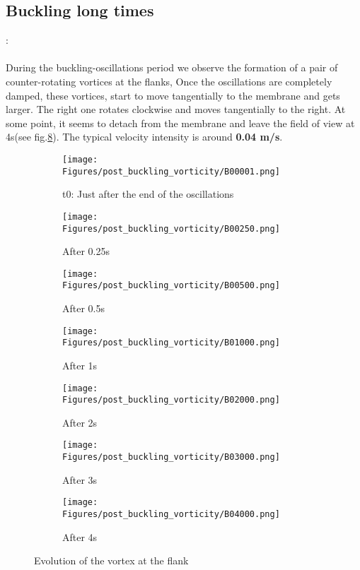 \documentclass[a4paper,10pt]{report}
\begin{document}
\subsection{Buckling long times}:
\paragraph{}
During the buckling-oscillations period we observe the formation of a pair of counter-rotating vortices at the flanks, Once the oscillations are completely damped, these vortices, start to move tangentially to the membrane and gets larger. The right one rotates clockwise and moves tangentially to the right.
At some point, it seems to detach from the membrane and leave the field of view at 4s(see fig.\ref{fig:vortexlife}).
The typical velocity intensity is around \textbf{0.04 m/s}.
 \begin{figure}[htbp]%
	\centering%
	 \begin{subfigure}[t]{0.25\textwidth}%
        \texttt{[image: Figures/post\_buckling\_vorticity/B00001.png]}%
        \caption{t0: Just after the end of the oscillations}%
				\label{fig:t0}%
    \end{subfigure}%
		\begin{subfigure}[t]{0.25\textwidth}%
        \texttt{[image: Figures/post\_buckling\_vorticity/B00250.png]}%
        \caption{After 0.25s}%
				\label{fig:25ms}%
    \end{subfigure}%
    \begin{subfigure}[t]{0.25\textwidth}%
        \texttt{[image: Figures/post\_buckling\_vorticity/B00500.png]}%
        \caption{After 0.5s}%
				\label{fig:500ms}%
    \end{subfigure}%
		\begin{subfigure}[t]{0.25\textwidth}%
        \texttt{[image: Figures/post\_buckling\_vorticity/B01000.png]}%
        \caption{After 1s}%
				\label{fig:1000ms}%
    \end{subfigure}%
		
		\begin{subfigure}[t]{0.25\textwidth}%
        \texttt{[image: Figures/post\_buckling\_vorticity/B02000.png]}%
        \caption{After 2s}%
				\label{fig:2000ms}%
    \end{subfigure}%
		\begin{subfigure}[t]{0.25\textwidth}%
        \texttt{[image: Figures/post\_buckling\_vorticity/B03000.png]}%
        \caption{After 3s}%
				\label{fig:3000ms}%
    \end{subfigure}
		\begin{subfigure}[t]{0.25\textwidth}%
        \texttt{[image: Figures/post\_buckling\_vorticity/B04000.png]}%
        \caption{After 4s}%
				\label{fig:4000ms}%
    \end{subfigure}
		\caption{Evolution of the vortex at the flank}%
		\label{fig:vortexlife}%
\end{figure}
\end{document}
